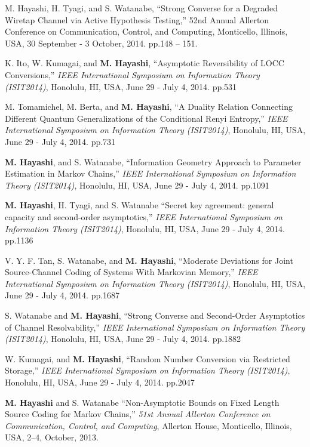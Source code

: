 \documentclass[a4paper,12pt,oneside]{article}
\begin{document}
\begin{enumerate}
M. Hayashi, H. Tyagi, and S. Watanabe, ``Strong Converse for a Degraded Wiretap Channel via Active Hypothesis Testing,'' 52nd Annual Allerton Conference on Communication, Control, and Computing, Monticello, Illinois, USA, 30 September - 3 October, 2014. pp.148 -- 151.

K. Ito, W. Kumagai, and \textbf{M. Hayashi}, 
``Asymptotic Reversibility of LOCC Conversions,'' 
{\em IEEE International Symposium on Information Theory (ISIT2014)}, Honolulu, HI, USA, June 29 - July 4, 
2014. pp.531

M. Tomamichel, M. Berta, and \textbf{M. Hayashi}, 
``A Duality Relation Connecting Different Quantum Generalizations of the Conditional Renyi Entropy,'' 
{\em IEEE International Symposium on Information Theory (ISIT2014)}, 
Honolulu, HI, USA, June 29 - July 4, 2014. pp.731

\textbf{M. Hayashi}, and S. Watanabe, 
``Information Geometry Approach to Parameter Estimation in Markov Chains,'' {\em IEEE International Symposium on Information Theory (ISIT2014)}, Honolulu, HI, USA, June 29 - July 4, 2014. pp.1091

\textbf{M. Hayashi}, H. Tyagi, and S. Watanabe 
``Secret key agreement: general capacity and second-order asymptotics,'' 
{\em IEEE International Symposium on Information Theory (ISIT2014)}, Honolulu, HI, USA, June 29 - July 4, 2014. pp.1136

V. Y. F. Tan, S. Watanabe, and \textbf{M. Hayashi}, 
``Moderate Deviations for Joint Source-Channel Coding of Systems With Markovian Memory,'' 
{\em IEEE International Symposium on Information Theory (ISIT2014)}, Honolulu, HI, USA, June 29 - July 4, 2014. pp.1687

S. Watanabe and \textbf{M. Hayashi},
``Strong Converse and Second-Order Asymptotics of Channel Resolvability,''
{\em IEEE International Symposium on Information Theory (ISIT2014)}, Honolulu, HI, USA, June 29 - July 4, 2014. pp.1882

W. Kumagai, and \textbf{M. Hayashi}, 
``Random Number Conversion via Restricted Storage,'' 
{\em IEEE International Symposium on Information Theory (ISIT2014)}, Honolulu, HI, USA, June 29 - July 4, 2014. pp.2047

\textbf{M. Hayashi} and S. Watanabe
``Non-Asymptotic Bounds on Fixed Length Source Coding for Markov Chains,''
{\em 51st Annual Allerton Conference on Communication, Control, and Computing}, 
Allerton House, Monticello, Illinois, USA, 2--4, October, 2013.


\end{enumerate}
\end{document}
